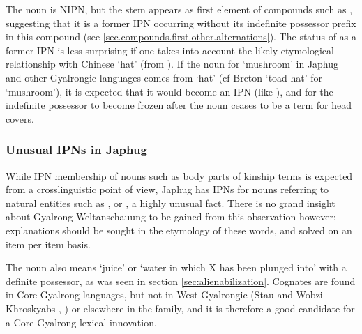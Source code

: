 The noun  is NIPN, but the stem  appears as first element of compounds such as , suggesting that it is a former IPN occurring without its indefinite possessor prefix in this compound (see \ref{sec.compounds.first.other.alternations}). The status of  as a former IPN is less surprising if one takes into account the likely etymological relationship with Chinese   `hat' (from ).  If the noun for `mushroom' in Japhug and other Gyalrongic languages comes from `hat' (cf Breton  `toad hat' for `mushroom'), it is expected that it would become an IPN (like ), and for the indefinite possessor  to become frozen after the noun ceases to be a term for head covers.
 
\subsubsection{Unusual IPNs in Japhug} \label{sec:earth.IPN}
While IPN membership of nouns such as body parts of kinship terms is expected from a crosslinguistic point of view, Japhug has IPNs for nouns referring to natural entities such as ,  or , a highly unusual fact. There is no grand insight about Gyalrong Weltanschauung to be gained from this observation however; explanations should be sought in the etymology of these words, and solved on an item per item basis.  

The noun  also means `juice' or `water in which X has been plunged into' with a definite possessor, as was seen in section \ref{sec:alienabilization}. Cognates are found in Core Gyalrong languages, but not in West Gyalrongic (Stau  and Wobzi Khroskyabs , \citealt[610]{jacques17stau}) or elsewhere in the family, and it is therefore a good candidate for a Core Gyalrong lexical innovation. 

